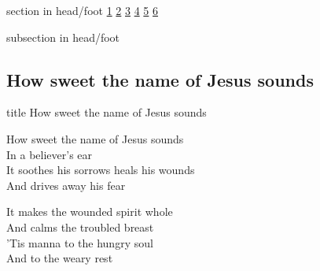 \documentclass{beamer}
\begin{document}
{
{ 
 {
 \begin{beamercolorbox}[ht=4.5ex,dp=1.5ex,%
      leftskip=.3cm,rightskip=.3cm plus1fil]{section in head/foot}
 \fontsize{12}{25}\selectfont 
\hyperlink{How sweet the name of Jesus sounds[]1}{1}
\hyperlink{How sweet the name of Jesus sounds[]2}{2}
\hyperlink{How sweet the name of Jesus sounds[]3}{3}
\hyperlink{How sweet the name of Jesus sounds[]4}{4}
\hyperlink{How sweet the name of Jesus sounds[]5}{5}
\hyperlink{How sweet the name of Jesus sounds[]6}{6}
 
 \end{beamercolorbox}%
  \begin{beamercolorbox}[ht=2.5ex,dp=1.125ex,%
   leftskip=.3cm,rightskip=.3cm plus1fil]{subsection in head/foot}
   \insertauthor
 \end{beamercolorbox}%
 }
}
\subsection{ How sweet the name of Jesus sounds }

\hypertarget{How sweet the name of Jesus sounds[]}{}
\begin{frame}{}
 \vfill
  \centering
  \begin{beamercolorbox}[sep=8pt,center,shadow=true,rounded=true]{title}
    How sweet the name of Jesus sounds    
  \end{beamercolorbox}
  \vfill
\end{frame}

\hypertarget{How sweet the name of Jesus sounds[]1}{}
\begin{frame}{}
\fontsize{ 18 }{ 23 }\selectfont

How sweet the name of Jesus sounds\\ 
In a believer's ear\\ 
It soothes his sorrows heals his wounds\\ 
And drives away his fear 

\end{frame}

\hypertarget{How sweet the name of Jesus sounds[]2}{}
\begin{frame}{}
\fontsize{ 18 }{ 23 }\selectfont

It makes the wounded spirit whole\\ 
And calms the troubled breast\\ 
'Tis manna to the hungry soul\\ 
And to the weary rest 


\end{frame}}
\end{document}

